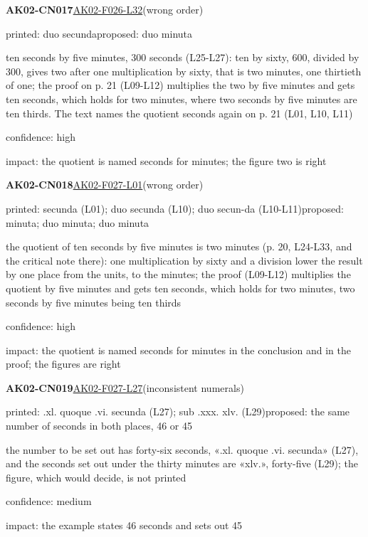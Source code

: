 \documentclass[11pt]{article}
\begin{document}
\noindent\textbf{AK02-CN017}\enspace\hyperlink{AK02-F026-L32}{AK02-F026-L32}\enspace(wrong order)\par\noindent printed: duo secunda\enspace proposed: duo minuta\par\noindent ten seconds by five minutes, 300 seconds (L25-L27): ten by sixty, 600, divided by 300, gives two after one multiplication by sixty, that is two minutes, one thirtieth of one; the proof on p. 21 (L09-L12) multiplies the two by five minutes and gets ten seconds, which holds for two minutes, where two seconds by five minutes are ten thirds. The text names the quotient seconds again on p. 21 (L01, L10, L11)\par\noindent confidence: high\par\noindent impact: the quotient is named seconds for minutes; the figure two is right\par\medskip
\noindent\textbf{AK02-CN018}\enspace\hyperlink{AK02-F027-L01}{AK02-F027-L01}\enspace(wrong order)\par\noindent printed: secunda (L01); duo secunda (L10); duo secun-da (L10-L11)\enspace proposed: minuta; duo minuta; duo minuta\par\noindent the quotient of ten seconds by five minutes is two minutes (p. 20, L24-L33, and the critical note there): one multiplication by sixty and a division lower the result by one place from the units, to the minutes; the proof (L09-L12) multiplies the quotient by five minutes and gets ten seconds, which holds for two minutes, two seconds by five minutes being ten thirds\par\noindent confidence: high\par\noindent impact: the quotient is named seconds for minutes in the conclusion and in the proof; the figures are right\par\medskip
\noindent\textbf{AK02-CN019}\enspace\hyperlink{AK02-F027-L27}{AK02-F027-L27}\enspace(inconsistent numerals)\par\noindent printed: .xl. quoque .vi. secunda (L27); sub .xxx. xlv. (L29)\enspace proposed: the same number of seconds in both places, 46 or 45\par\noindent the number to be set out has forty-six seconds, «.xl. quoque .vi. secunda» (L27), and the seconds set out under the thirty minutes are «xlv.», forty-five (L29); the figure, which would decide, is not printed\par\noindent confidence: medium\par\noindent impact: the example states 46 seconds and sets out 45\par\medskip
\end{document}
